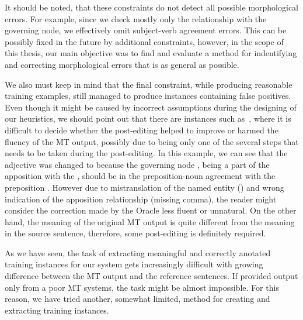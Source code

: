 It should be noted, that these constraints do not detect all possible morphological errors. For example,
since we check mostly only the relationship with the governing node, we effectively omit subject-verb
agreement errors. This can be possibly
fixed in the future by additional constraints, however, in the scope of this thesis, our main objective was
to find and evaluate a method for indentifying and correcting morphological errors that is as general as possible.

We also must keep in mind that the final constraint, while producing reasonable training examples,
still managed to produce instances containing false positives. Even though it might be caused by
incorrect assumptions during the designing of our heuristics, we should point out that there
are instances such as~, where it is difficult to decide whether the post-editing
helped to improve or harmed the fluency of the MT output, possibly due to being only one of the
several steps that needs to be taken during the post-editing.
In this example, we can see that the adjective  was changed to  because the
governing node , being a part of the apposition with the , should
be in the preposition-noun agreement with the preposition . However due to mistranslation of the
named entity () and wrong indication of the apposition relationship (missing comma),
the reader might consider the correction made by the Oracle less fluent or unnatural. On the other hand,
the meaning of the original MT output is quite different from the meaning in the source sentence, therefore,
some post-editing is definitely required.

As we have seen, the task of extracting meaningful and correctly anotated training instances for our system
 gets increasingly difficult with growing difference between the MT output and the reference sentences.
If provided output only from a poor MT systems, the task might be almost impossible. For this reason,
we have tried another, somewhat limited, method for creating and extracting training instances.

